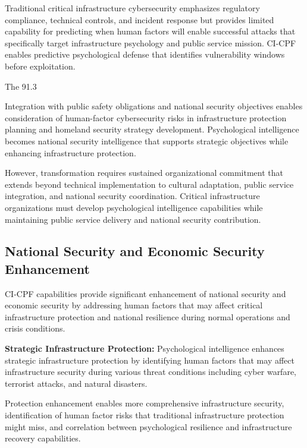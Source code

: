 \documentclass[10pt, twocolumn]{article}
\begin{document}
Traditional critical infrastructure cybersecurity emphasizes regulatory compliance, technical controls, and incident response but provides limited capability for predicting when human factors will enable successful attacks that specifically target infrastructure psychology and public service mission. CI-CPF enables predictive psychological defense that identifies vulnerability windows before exploitation.

The 91.3%

Integration with public safety obligations and national security objectives enables consideration of human-factor cybersecurity risks in infrastructure protection planning and homeland security strategy development. Psychological intelligence becomes national security intelligence that supports strategic objectives while enhancing infrastructure protection.

However, transformation requires sustained organizational commitment that extends beyond technical implementation to cultural adaptation, public service integration, and national security coordination. Critical infrastructure organizations must develop psychological intelligence capabilities while maintaining public service delivery and national security contribution.

\subsection{National Security and Economic Security Enhancement}

CI-CPF capabilities provide significant enhancement of national security and economic security by addressing human factors that may affect critical infrastructure protection and national resilience during normal operations and crisis conditions.

\textbf{Strategic Infrastructure Protection:} Psychological intelligence enhances strategic infrastructure protection by identifying human factors that may affect infrastructure security during various threat conditions including cyber warfare, terrorist attacks, and natural disasters.

Protection enhancement enables more comprehensive infrastructure security, identification of human factor risks that traditional infrastructure protection might miss, and correlation between psychological resilience and infrastructure recovery capabilities.
\end{document}
